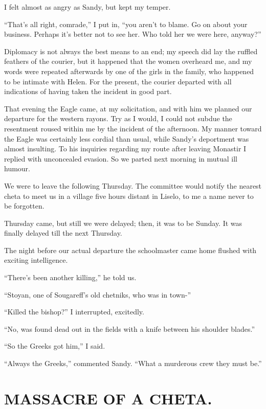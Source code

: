 \documentclass[a5paper,12pt]{book}
\begin{document}
I felt almost as angry as Sandy, but kept my temper. 

“That’s all right, comrade,” I put in, “you aren’t to blame. Go on about your business. Perhaps it’s better not to see her. Who told her we were here, anyway?”

Diplomacy is not always the best means to an end; my speech did lay the ruffled feathers of the courier, but it happened that the women overheard me, and my words were repeated afterwards by one of the girls in the family, who happened to be intimate with Helen. For the present, the courier departed with all indications of having taken the incident in good part. 

That evening the Eagle came, at my solicitation, and with him we planned our departure for the western rayons. Try as I would, I could not subdue the resentment roused within me by the incident of the afternoon. My manner toward the Eagle was certainly less cordial than usual, while Sandy's deportment was almost insulting. To his inquiries regarding my route after leaving Monastir I replied with unconcealed evasion. So we parted next morning in mutual ill humour. 

We were to leave the following Thursday. The committee would notify the nearest cheta to meet us in a village five hours distant in Liselo, to me a name never to be forgotten. 

Thursday came, but still we were delayed; then, it was to be Sunday. It was finally delayed till the next Thursday. 

The night before our actual departure the schoolmaster came home flushed with exciting intelligence. 

“There’s been another killing,” he told us. 

“Stoyan, one of Sougareff’s old chetniks, who was in town-”

“Killed the bishop?” I interrupted, excitedly. 

“No, was found dead out in the fields with a knife between his shoulder blades.”

“So the Greeks got him,” I said. 

“Always the Greeks,” commented Sandy. “What a murderous crew they must be.”


\chapter{MASSACRE OF A CHETA.}
\end{document}
